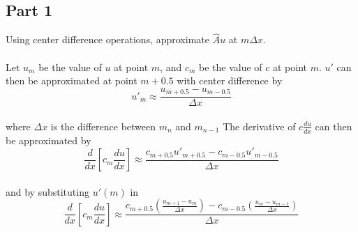 \documentclass{amsart}
\begin{document}
	\subsection{Part 1}
	Using center difference operations, approximate $\hat{A}u$ at $m\Delta x$.
	\\\\
	Let $u_m$ be the value of $u$ at point $m$, and $c_m$ be the value of $c$ at point $m$. $u'$ can then be approximated at point $m+0.5$ with center difference by\\
	\[u'_{m} \approx \frac{u_{m+0.5} - u_{m-0.5}}{\Delta x}
	\]\\
	where $\Delta x$ is the difference between $m_n$ and $m_{n-1}$ The derivative of $c\frac{du}{dx}$ can then be approximated by
	\\
	\[\frac{d}{dx}\left[c_m\frac{du}{dx}\right] \approx
	  \frac{c_{m+0.5}u'_{m+0.5} - c_{m-0.5}u'_{m-0.5}}{\Delta x}
	\]\\
	and by substituting $u'(m)$ in\\
	\[ \frac{d}{dx}\left[c_m\frac{du}{dx}\right] \approx
	   \frac{c_{m+0.5}\left( \frac{u_{m+1}- u_m}{\Delta x}\right) - c_{m-0.5}\left( \frac{u_m - u_{m-1}}{\Delta x}\right)}{\Delta x}
	\]
	\\\\
\end{document}
